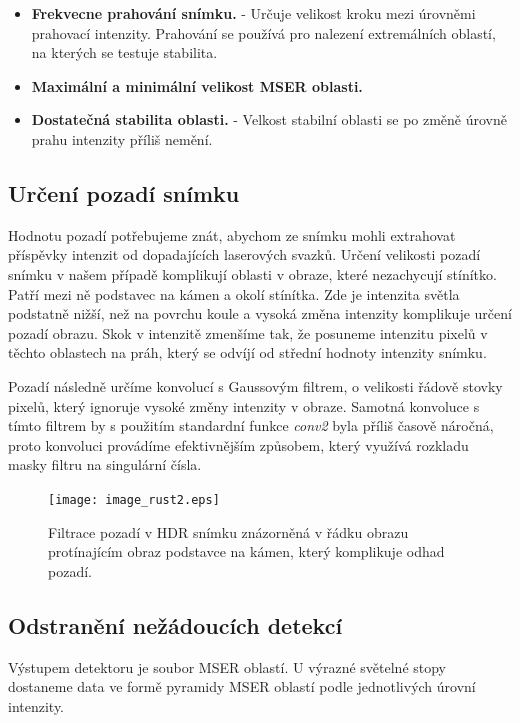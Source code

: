    \begin{itemize}
   \item \textbf{Frekvecne prahování snímku.} - Určuje velikost kroku mezi úrovněmi prahovací intenzity. Prahování se používá pro nalezení extremálních oblastí, na kterých se testuje stabilita.
   
   \item \textbf{Maximální a minimální velikost MSER oblasti.} 
   
   \item \textbf{Dostatečná stabilita oblasti.} - Velkost stabilní oblasti se po změně úrovně prahu intenzity příliš nemění. 
   \end{itemize}

\subsection*{Určení pozadí snímku}
	Hodnotu pozadí potřebujeme znát, abychom ze snímku mohli extrahovat příspěvky intenzit od dopadajících laserových svazků. Určení velikosti pozadí snímku v našem případě komplikují oblasti v obraze, které nezachycují stínítko. Patří mezi ně podstavec na kámen a okolí stínítka. Zde je intenzita světla podstatně nižší, než na povrchu koule a vysoká změna intenzity komplikuje určení pozadí obrazu. Skok v intenzitě zmenšíme tak, že posuneme intenzitu pixelů v těchto oblastech na práh, který se odvíjí od střední hodnoty intenzity snímku. 
	
	Pozadí následně určíme konvolucí s Gaussovým filtrem, o velikosti řádově stovky pixelů, který ignoruje vysoké změny intenzity v obraze. Samotná konvoluce s tímto filtrem by s použitím standardní funkce \textit{conv2} byla příliš časově náročná, proto konvoluci provádíme efektivnějším způsobem, který využívá rozkladu masky filtru na singulární čísla.
	
\begin{figure}[htbp]
    \centering\texttt{[image: image\_rust2.eps]}
     \caption[Filtrace pozadí.]{Filtrace pozadí v HDR snímku znázorněná v řádku obrazu protínajícím obraz podstavce na kámen, který komplikuje odhad pozadí.}
        \label{fig:pozadi}
\end{figure}
	      
\subsection{Odstranění nežádoucích detekcí}

Výstupem detektoru je soubor MSER oblastí. U výrazné světelné stopy dostaneme data ve formě pyramidy MSER oblastí podle jednotlivých úrovní intenzity. 

